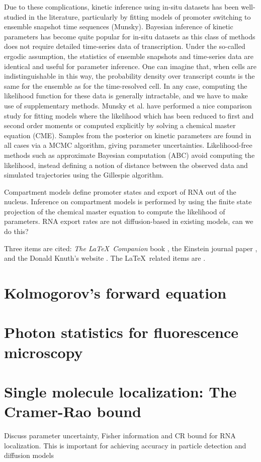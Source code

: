\documentclass{article}
\begin{document}
Due to these complications, kinetic inference using  in-situ datasets has been well-studied in the literature, particularly by fitting models of promoter switching to ensemble snapshot time sequences (Munsky). Bayesian inference of kinetic parameters has become quite popular for in-situ datasets as this class of methods does not require detailed time-series data of transcription. Under the so-called ergodic assumption, the statistics of ensemble snapshots and time-series data are identical and useful for parameter inference. One can imagine that, when cells are indistinguishable in this way, the probability density over transcript counts is the same for the ensemble as for the time-resolved cell. In any case, computing the likelihood function for these data is generally intractable, and we have to make use of supplementary methods. Munsky et al. have performed a nice comparison study for fitting models where the likelihood which has been reduced to first and second order moments or computed explicitly by solving a chemical master equation (CME). Samples from the posterior on kinetic parameters are found in all cases via a MCMC algorithm, giving parameter uncertainties. Likelihood-free methods such as approximate Bayesian computation (ABC) avoid computing the likelihood, instead defining a notion of distance between the observed data and simulated trajectories using the Gillespie algorithm.


Compartment models define promoter states and export of RNA out of the nucleus. Inference on compartment models is performed by using the finite state projection of the chemical master equation to compute the likelihood of parameters. RNA export rates are not diffusion-based in existing models, can we do this?  

Three items are cited: \textit{The \LaTeX\ Companion} book \cite{latexcompanion}, the Einstein journal paper \citet{einstein}, and the 
Donald Knuth's website \cite{knuthwebsite}. The \LaTeX\ related items are
\cite{latexcompanion,knuthwebsite}.  



\appendix

\section{Kolmogorov's forward equation}

\section{Photon statistics for fluorescence microscopy}



\section{Single molecule localization: The Cramer-Rao bound}

Discuss parameter uncertainty, Fisher information and CR bound for RNA localization. This is important for achieving accuracy in particle detection and diffusion models
\end{document}
